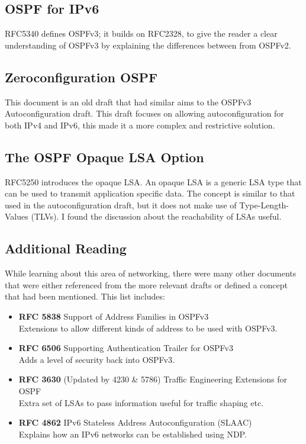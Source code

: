 \documentclass[12pt]{report}
\begin{document}
\subsection{OSPF for IPv6}
RFC5340 defines OSPFv3\cite{RFC5340}; it builds on RFC2328, to give the
reader a clear understanding of OSPFv3 by explaining the differences between
from OSPFv2. 

\subsection{Zeroconfiguration OSPF}
This document\cite{draft-dimitri-zospf-00} is an old draft that had similar
aims to the OSPFv3 Autoconfiguration draft. This draft focuses on allowing
autoconfiguration for both IPv4 and IPv6, this made it a more complex and
restrictive solution. 

\subsection{The OSPF Opaque LSA Option}
RFC5250\cite{RFC5250} introduces the opaque LSA\@. An opaque LSA is a generic
LSA type that can be used to transmit application specific data. The concept is
similar to that used in the autoconfiguration draft, but it does not make use
of Type-Length-Values (TLVs). I found the
discussion about the reachability of LSAs useful.

\subsection{Additional Reading}
While learning about this area of networking, there were many other documents
that were either referenced from the more relevant drafts or defined a concept
that had been mentioned. This list includes:

\begin{itemize} 
  \item {\bf RFC 5838} Support of Address Families in OSPFv3 
	\\ Extensions to allow different kinds of address to be used with OSPFv3.
  
	\item {\bf RFC 6506} Supporting Authentication Trailer for OSPFv3 
	\\ Adds a level of security back into OSPFv3.

	\item {\bf RFC 3630} (Updated by 4230 \& 5786) Traffic Engineering Extensions for OSPF
	\\ Extra set of LSAs to pass information useful for traffic shaping etc.\@
  
\item {\bf RFC 4862} IPv6 Stateless Address Autoconfiguration (SLAAC)
	\\ Explains how an IPv6 networks can be established using NDP.\@

\end{itemize}
\end{document}
